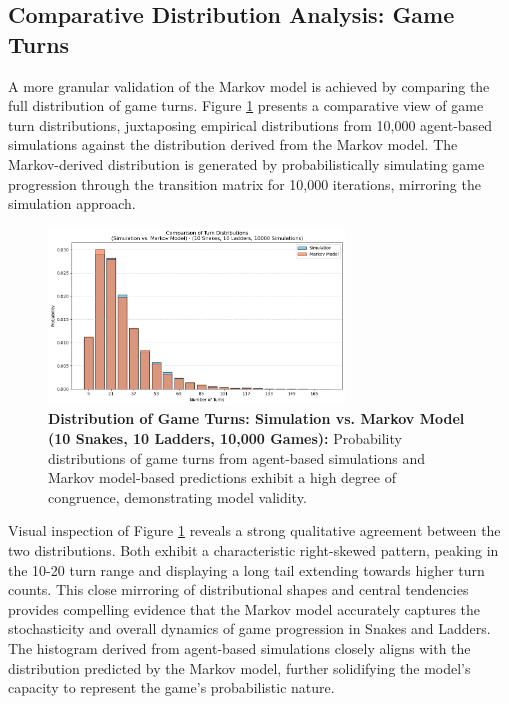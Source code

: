 \subsection{Comparative Distribution Analysis: Game Turns}

A more granular validation of the Markov model is achieved by comparing the full distribution of game turns. Figure \ref{fig:frequencydistributionMarkov} presents a comparative view of game turn distributions, juxtaposing empirical distributions from 10,000 agent-based simulations against the distribution derived from the Markov model. The Markov-derived distribution is generated by probabilistically simulating game progression through the transition matrix for 10,000 iterations, mirroring the simulation approach.

\begin{figure}[th]
	\centering
	\includegraphics[width=0.7\textwidth]{"../Markov Modelling/Data/FrequencyOveralyed.png"}
	\caption{\textbf{Distribution of Game Turns: Simulation vs. Markov Model (10 Snakes, 10 Ladders, 10,000 Games):} Probability distributions of game turns from agent-based simulations and Markov model-based predictions exhibit a high degree of congruence, demonstrating model validity.}
	\label{fig:frequencydistributionMarkov}
\end{figure}

Visual inspection of Figure \ref{fig:frequencydistributionMarkov} reveals a strong qualitative agreement between the two distributions. Both exhibit a characteristic right-skewed pattern, peaking in the 10-20 turn range and displaying a long tail extending towards higher turn counts. This close mirroring of distributional shapes and central tendencies provides compelling evidence that the Markov model accurately captures the stochasticity and overall dynamics of game progression in Snakes and Ladders. The histogram derived from agent-based simulations closely aligns with the distribution predicted by the Markov model, further solidifying the model's capacity to represent the game's probabilistic nature.

